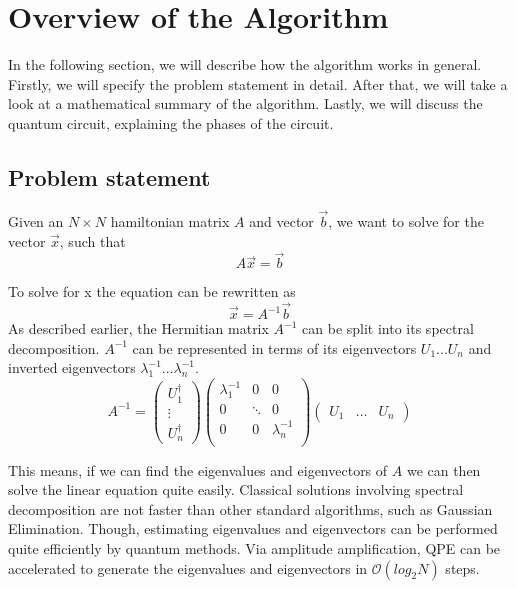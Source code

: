 \section{ Overview of the Algorithm}
In the following section, we will describe how the algorithm works in general.
Firstly, we will specify the problem statement in detail.
After that, we will take a look at a mathematical summary of the algorithm. 
Lastly, we will discuss the quantum circuit, explaining the phases of the circuit.

\subsection{Problem statement}

Given an $N\times N$ hamiltonian matrix $A$ and vector $\vec b$, we want to solve for the vector $\vec x$, such that
\begin{equation}
A \vec{x} = \vec{b}
\end{equation}

To solve for x the equation can be rewritten as
\begin{equation}
\vec{x} = A^{-1}\vec{b}
\end{equation}
As described earlier, the Hermitian matrix $A^{-1}$ can be split into its spectral decomposition. 
$A^{-1}$ can be represented in terms of its eigenvectors $U_1 ... U_n$ and inverted eigenvectors $\lambda_1^{-1 } ... \lambda_n^{-1}$.
\begin{equation} 
 A^{-1} = \begin{pmatrix} U^\dagger_1 \\ \vdots \\ U^\dagger_n \end{pmatrix}
\begin{pmatrix} \lambda_1^{-1} & 0 & 0\\ 0 & \ddots & 0\\ 0 & 0& \lambda_n^{-1} \\ \end{pmatrix}
\begin{pmatrix} U_1 & \dots & U_n \end{pmatrix} 
\end{equation}

This means, if we can find the eigenvalues and eigenvectors of $A$ we can then solve the linear equation quite easily. 
Classical solutions involving spectral decomposition are not faster than other standard algorithms, such as Gaussian Elimination. 
Though, estimating eigenvalues and eigenvectors can be performed quite efficiently by quantum methods.
Via amplitude amplification, QPE can be accelerated to generate the eigenvalues and eigenvectors in $\mathcal{O}(log_2 N)$ steps.

